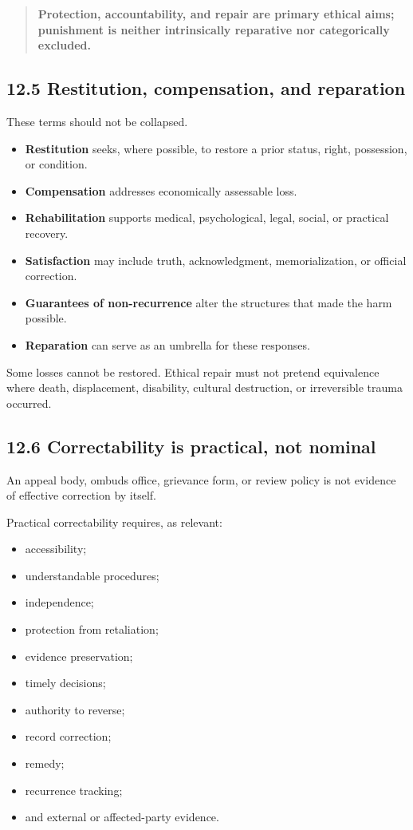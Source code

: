 \documentclass[
  11pt,
]{article}
\providecommand{\tightlist}{%
  \setlength{\itemsep}{0pt}\setlength{\parskip}{0pt}}
\begin{document}
\begin{quote}
\textbf{Protection, accountability, and repair are primary ethical aims;
punishment is neither intrinsically reparative nor categorically
excluded.}
\end{quote}

\subsection{12.5 Restitution, compensation, and
reparation}\label{restitution-compensation-and-reparation}

These terms should not be collapsed.

\begin{itemize}
\tightlist
\item
  \textbf{Restitution} seeks, where possible, to restore a prior status,
  right, possession, or condition.
\item
  \textbf{Compensation} addresses economically assessable loss.
\item
  \textbf{Rehabilitation} supports medical, psychological, legal,
  social, or practical recovery.
\item
  \textbf{Satisfaction} may include truth, acknowledgment,
  memorialization, or official correction.
\item
  \textbf{Guarantees of non-recurrence} alter the structures that made
  the harm possible.
\item
  \textbf{Reparation} can serve as an umbrella for these responses.
\end{itemize}

Some losses cannot be restored. Ethical repair must not pretend
equivalence where death, displacement, disability, cultural destruction,
or irreversible trauma occurred.

\subsection{12.6 Correctability is practical, not
nominal}\label{correctability-is-practical-not-nominal}

An appeal body, ombuds office, grievance form, or review policy is not
evidence of effective correction by itself.

Practical correctability requires, as relevant:

\begin{itemize}
\tightlist
\item
  accessibility;
\item
  understandable procedures;
\item
  independence;
\item
  protection from retaliation;
\item
  evidence preservation;
\item
  timely decisions;
\item
  authority to reverse;
\item
  record correction;
\item
  remedy;
\item
  recurrence tracking;
\item
  and external or affected-party evidence.
\end{itemize}
\end{document}
